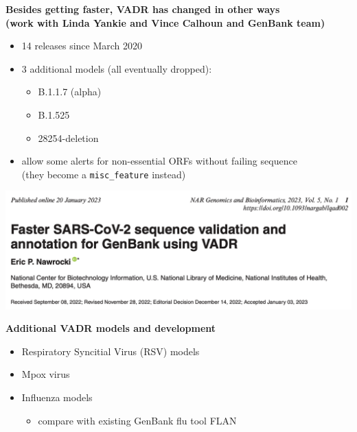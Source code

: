 \documentclass[landscape]{slides}
\begin{document}
\begin{slide}
\begin{center}
\textbf{Besides getting faster, VADR has changed in other ways \\ (work with Linda Yankie and Vince Calhoun and GenBank team)}

\begin{itemize}
\item 14 releases since March 2020
\item 3 additional models (all eventually dropped):
  \begin{itemize}
  \item B.1.1.7 (alpha)
  \item B.1.525
  \item 28254-deletion
  \end{itemize}
\item allow some alerts for non-essential ORFs without failing sequence \\ (they become a \texttt{misc\_feature} instead)
\end{itemize}

\end{center}

\vfill
\end{slide}
\begin{slide}
  \begin{center}
\includegraphics[width=10.5in]{figs/vadr-sarscov2-paper}
\end{center}

\vfill
\end{slide}
\begin{slide}
\begin{center}
  \textbf{Additional VADR models and development}
\end{center}

  \begin{itemize}
  \item Respiratory Syncitial Virus (RSV) models
  \item Mpox virus 
  \item Influenza models
    \begin{itemize}
      \item compare with existing GenBank flu tool FLAN
    \end{itemize}
  \end{itemize}

  \vfill
\end{slide}
\end{document}
